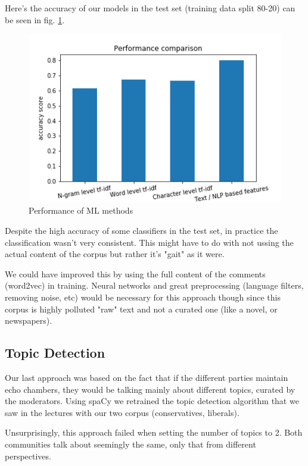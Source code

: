 \documentclass[11pt]{article}
\begin{document}
Here's the accuracy of our models in the test set (training data split 80-20) can be seen in fig. \ref{performance}.

\begin{figure}[h]
	\includegraphics[width=\columnwidth]{img/performance.png}
	\caption{\label{performance} Performance of ML methods}
\end{figure}

Despite the high accuracy of some classifiers in the test set, in practice the classification wasn't very consistent. This might have to do with not ussing the actual content of the corpus but rather it's "gait" as it were.

We could have improved this by using the full content of the comments (word2vec) in training. Neural networks and great preprocessing (language filters, removing noise, etc) would be necessary for this approach though since this corpus is highly polluted "raw" text and not a curated one (like a novel, or newspapers).

\subsection{Topic Detection}

Our last approach was based on the fact that if the different parties maintain echo chambers, they would be talking mainly about different topics, curated by the moderators. Using spaCy we retrained the topic detection algorithm that we saw in the lectures with our two corpus (conservatives, liberals).

Unsurprisingly, this approach failed when setting the number of topics to 2. Both communities talk about seemingly the same, only that from different perspectives.
\end{document}
